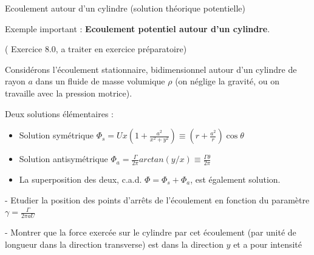 \begin{frame}{Ecoulement autour d'un cylindre (solution théorique potentielle)} \hypertarget{frame:toto}{}

\small


Exemple important : { \bf Ecoulement potentiel autour d'un cylindre}.

{\color{vert}( Exercice 8.0, a traiter en exercice préparatoire)} 

\medskip

Considérons l'écoulement stationnaire, bidimensionnel autour d'un cylindre de rayon $a$
dans un fluide de masse volumique $\rho$ (on néglige la gravité, ou on travaille avec la pression motrice).
\medskip

Deux solutions élémentaires :

\begin{itemize}
\item Solution symétrique $\Phi_s = U x \left( 1 + \frac{a^2}{x^2+y^2} \right)  
\equiv \left(r + \frac{a^2}{r} \right) \cos \theta$  

\item Solution antisymétrique $\Phi_a = \frac{\Gamma}{2 \pi} arctan( y/x) \equiv \frac{\Gamma \theta}{2 \pi}$ 

\end{itemize}

\pause

\begin{itemize}

\item La superposition des deux, c.a.d. $\Phi = \Phi_s + \Phi_a$, est également solution.

\end{itemize}

\medskip

- Etudier la position des points d'arrêts de l'écoulement en fonction du paramètre $\gamma = \frac{ \Gamma }{2 \pi a U}$



\medskip 

- Montrer que la force exercée sur le cylindre par cet écoulement (par unité de longueur dans la direction transverse) est dans la direction $y$ et a pour intensité 


\end{frame}
